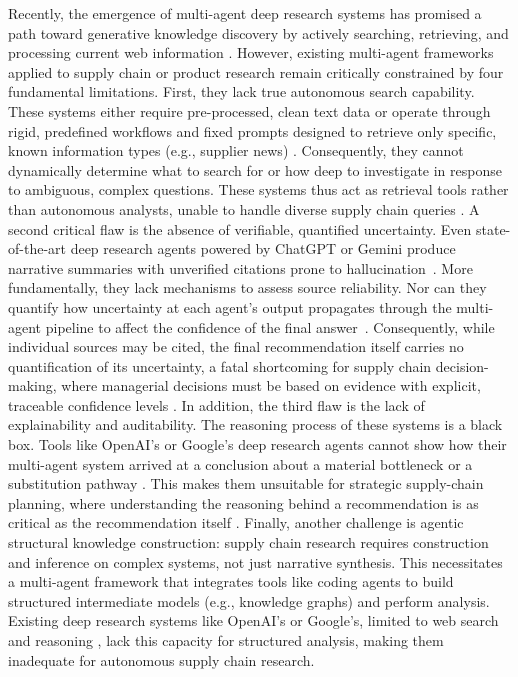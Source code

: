 \documentclass{article}
\begin{document}
Recently, the emergence of multi-agent deep research systems has promised a path toward generative knowledge discovery by actively searching, retrieving, and processing current web information \citep{xu2024multi}. However, existing multi-agent frameworks applied to supply chain or product research remain critically constrained by four fundamental limitations.
First, they lack true autonomous search capability. These systems either require pre-processed, clean text data \citep{jannelli2025agentic} or operate through rigid, predefined workflows and fixed prompts designed to retrieve only specific, known information types (e.g., supplier news) \citep{quan2024invagent}. Consequently, they cannot dynamically determine what to search for or how deep to investigate in response to ambiguous, complex questions. These systems thus act as retrieval tools rather than autonomous analysts, unable to handle diverse supply chain queries \citep{dong2025safesearch}.
A second critical flaw is the absence of verifiable, quantified uncertainty. Even state-of-the-art deep research agents powered by ChatGPT or Gemini produce narrative summaries with unverified citations prone to hallucination~\citep{huang2025deep}. More fundamentally, they lack mechanisms to assess source reliability. Nor can they quantify how uncertainty at each agent's output propagates through the multi-agent pipeline to affect the confidence of the final answer~\citep{nahar2025catch}. Consequently, while individual sources may be cited, the final recommendation itself carries no quantification of its uncertainty, a fatal shortcoming for supply chain decision-making, where managerial decisions must be based on evidence with explicit, traceable confidence levels \citep{tseng2018decision, simangunsong2012supply}.
In addition, the third flaw is the lack of explainability and auditability. The reasoning process of these systems is a black box. Tools like OpenAI's or Google's deep research agents cannot show how their multi-agent system arrived at a conclusion about a material bottleneck or a substitution pathway \citep{chan2024visibility}. This makes them unsuitable for strategic supply-chain planning, where understanding the reasoning behind a recommendation is as critical as the recommendation itself \citep{kosasih2024review}.
Finally, another challenge is agentic structural knowledge construction: supply chain research requires construction and inference on complex systems, not just narrative synthesis. This necessitates a multi-agent framework that integrates tools like coding agents to build structured intermediate models (e.g., knowledge graphs) and perform analysis. Existing deep research systems like OpenAI's or Google's, limited to web search and reasoning \citep{zhou2025efficient}, lack this capacity for structured analysis, making them inadequate for autonomous supply chain research.
\end{document}
